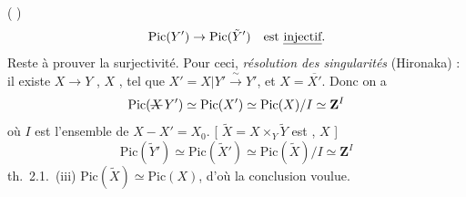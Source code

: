 \documentclass[11pt,a4paper]{article}
\begin{document}
(      )  
\[
\mathrm{Pic}(Y') \to \mathrm{Pic}(\tilde{Y}') \quad\text{est \emph{injectif}.}
\]
Reste à prouver la surjectivité. Pour ceci,    \emph{résolution des singularités} (Hironaka) : il existe $X \to Y$   , $X$ \struck{\ill{}}  , tel que $X' = X|Y' \xrightarrow{\ \sim\ } Y'$, et $X = \overline{X'}$. Donc on a
\[
\mathrm{Pic}(\text{\struck{$X$}}\,Y') \simeq \mathrm{Pic}(X') \simeq \mathrm{Pic}(X)/I \simeq \mathbf{Z}^{I}
\]
où $I$ est l'ensemble    de $X - X' = X_0$.      [  $\tilde{X} = X \times_Y \tilde{Y}$ est ,    \struck{\ill{}}    $X$   ]
\[
\mathrm{Pic}(\tilde{Y}') \simeq \mathrm{Pic}(\tilde{X}') \simeq \mathrm{Pic}(\tilde{X})/I \simeq \mathbf{Z}^{I}
\]
    th.\ 2.1.\ (iii)   $\mathrm{Pic}(\tilde{X}) \simeq \mathrm{Pic}(X)$, d'où la conclusion voulue.
\end{document}
